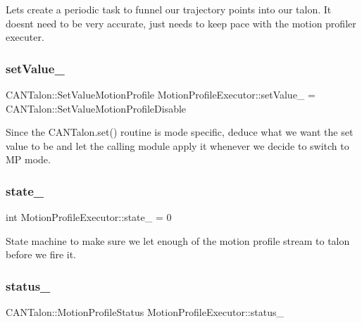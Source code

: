 Lets create a periodic task to funnel our trajectory points into our talon. It doesn\textquotesingle{}t need to be very accurate, just needs to keep pace with the motion profiler executer. \mbox{\label{class_motion_profile_executor_a34d9e17b3cdf0ad0a117cc2cc995e85f}} 
\subsubsection{\texorpdfstring{set\+Value\+\_\+}{setValue\_}}
{\footnotesize\ttfamily C\+A\+N\+Talon\+::\+Set\+Value\+Motion\+Profile Motion\+Profile\+Executor\+::set\+Value\+\_\+ = C\+A\+N\+Talon\+::\+Set\+Value\+Motion\+Profile\+Disable}

Since the C\+A\+N\+Talon.\+set() routine is mode specific, deduce what we want the set value to be and let the calling module apply it whenever we decide to switch to MP mode. \mbox{\label{class_motion_profile_executor_af971a9eb8807ea12c7d70befe44d2122}} 
\subsubsection{\texorpdfstring{state\+\_\+}{state\_}}
{\footnotesize\ttfamily int Motion\+Profile\+Executor\+::state\+\_\+ = 0}

State machine to make sure we let enough of the motion profile stream to talon before we fire it. \mbox{\label{class_motion_profile_executor_ab99b425d2adf9904079634fd61e10b96}} 
\subsubsection{\texorpdfstring{status\+\_\+}{status\_}}
{\footnotesize\ttfamily C\+A\+N\+Talon\+::\+Motion\+Profile\+Status Motion\+Profile\+Executor\+::status\+\_\+}

